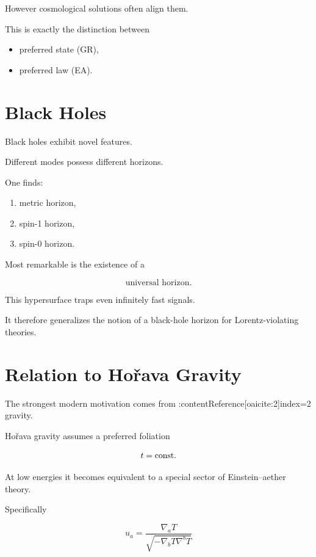 However cosmological solutions often align them.

This is exactly the distinction between

\begin{itemize}
\item preferred state (GR),
\item preferred law (EA).
\end{itemize}

\section{Black Holes}

Black holes exhibit novel features.

Different modes possess different horizons.

One finds:

\begin{enumerate}
\item metric horizon,
\item spin-1 horizon,
\item spin-0 horizon.
\end{enumerate}

Most remarkable is the existence of a

\begin{equation}
\text{universal horizon}.
\end{equation}

This hypersurface traps even infinitely fast signals.

It therefore generalizes the notion of a black-hole horizon
for Lorentz-violating theories.

\section{Relation to Ho\v rava Gravity}

The strongest modern motivation comes from
:contentReference[oaicite:2]{index=2}
gravity.

Ho\v rava gravity assumes a preferred foliation

\begin{equation}
t={\rm const}.
\end{equation}

At low energies it becomes equivalent to a special sector of
Einstein--aether theory.

Specifically

\begin{equation}
u_a
=
\frac{\nabla_a T}
{\sqrt{-\nabla_bT\nabla^bT}}
\end{equation}

